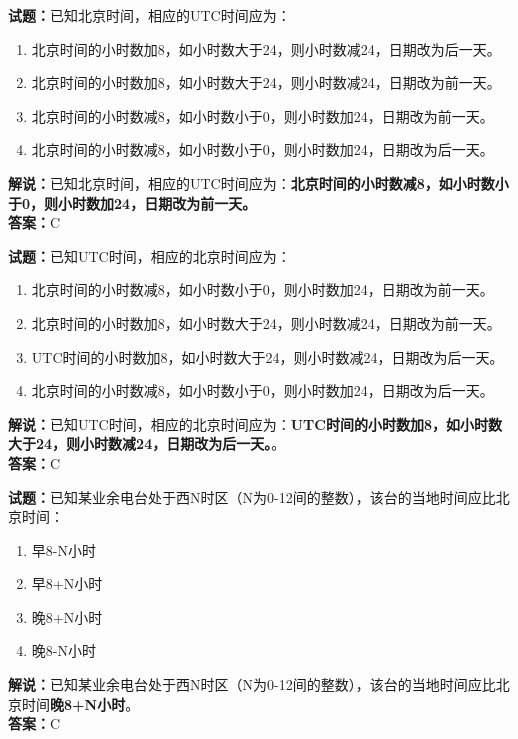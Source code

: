 \documentclass{ctexbook}
\begin{document}
\bigskip


\noindent\textbf{试题：}已知北京时间，相应的UTC时间应为：
\begin{enumerate}[leftmargin=3em]
\item 北京时间的小时数加8，如小时数大于24，则小时数减24，日期改为后一天。
\item 北京时间的小时数加8，如小时数大于24，则小时数减24，日期改为前一天。
\item 北京时间的小时数减8，如小时数小于0，则小时数加24，日期改为前一天。
\item 北京时间的小时数减8，如小时数小于0，则小时数加24，日期改为后一天。
\end{enumerate}
\noindent\textbf{解说：}已知北京时间，相应的UTC时间应为：\textbf{北京时间的小时数减8，如小时数小于0，则小时数加24，日期改为前一天。}\\\noindent\textbf{答案：}C


\bigskip


\noindent\textbf{试题：}已知UTC时间，相应的北京时间应为：
\begin{enumerate}[leftmargin=3em]
\item 北京时间的小时数减8，如小时数小于0，则小时数加24，日期改为前一天。
\item 北京时间的小时数加8，如小时数大于24，则小时数减24，日期改为前一天。
\item UTC时间的小时数加8，如小时数大于24，则小时数减24，日期改为后一天。
\item 北京时间的小时数减8，如小时数小于0，则小时数加24，日期改为后一天。
\end{enumerate}
\noindent\textbf{解说：}已知UTC时间，相应的北京时间应为：\textbf{UTC时间的小时数加8，如小时数大于24，则小时数减24，日期改为后一天。}。\\\noindent\textbf{答案：}C


\bigskip


\noindent\textbf{试题：}已知某业余电台处于西N时区（N为0-12间的整数），该台的当地时间应比北京时间：
\begin{enumerate}[leftmargin=3em]
\item 早8-N小时
\item 早8+N小时
\item 晚8+N小时
\item 晚8-N小时
\end{enumerate}
\noindent\textbf{解说：}已知某业余电台处于西N时区（N为0-12间的整数），该台的当地时间应比北京时间\textbf{晚8+N小时}。\\\noindent\textbf{答案：}C
\end{document}
